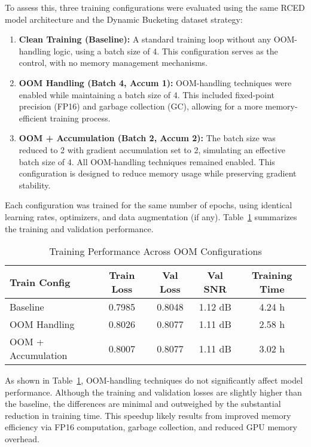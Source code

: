 To assess this, three training configurations were evaluated using the same RCED model architecture and the Dynamic Bucketing dataset strategy:

\begin{enumerate}
    \item \textbf{Clean Training (Baseline):} A standard training loop without any OOM-handling logic, using a batch size of 4. This configuration serves as the control, with no memory management mechanisms.
    
    \item \textbf{OOM Handling (Batch 4, Accum 1):} OOM-handling techniques were enabled while maintaining a batch size of 4. This included fixed-point precision (FP16) and garbage collection (GC), allowing for a more memory-efficient training process.
    
    \item \textbf{OOM + Accumulation (Batch 2, Accum 2):} The batch size was reduced to 2 with gradient accumulation set to 2, simulating an effective batch size of 4. All OOM-handling techniques remained enabled. This configuration is designed to reduce memory usage while preserving gradient stability.
\end{enumerate}

Each configuration was trained for the same number of epochs, using identical learning rates, optimizers, and data augmentation (if any). Table~\ref{tab:oom_training} summarizes the training and validation performance.

\vspace{1em}
\begin{table}[H]
\centering
\caption{Training Performance Across OOM Configurations}
\label{tab:oom_training}
\begin{tabular}{|l|c|c|c|c|}
\hline
\textbf{Train Config} & \textbf{Train Loss} & \textbf{Val Loss} & \textbf{Val SNR} & \textbf{Training Time} \\
\hline
Baseline               & 0.7985 & 0.8048 & 1.12 dB & 4.24 h \\
OOM Handling           & 0.8026 & 0.8077 & 1.11 dB & 2.58 h \\
OOM + Accumulation     & 0.8007 & 0.8077 & 1.11 dB & 3.02 h \\
\hline
\end{tabular}
\end{table}

As shown in Table~\ref{tab:oom_training}, OOM-handling techniques do not significantly affect model performance. Although the training and validation losses are slightly higher than the baseline, the differences are minimal and outweighed by the substantial reduction in training time. This speedup likely results from improved memory efficiency via FP16 computation, garbage collection, and reduced GPU memory overhead.

